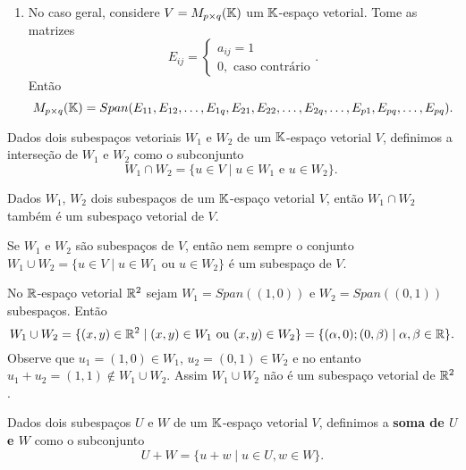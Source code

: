 \begin{exemplos}
\begin{enumerate}
        \item No caso geral, considere $V = M_{p \times q}(\mathbb{K})$ um $\mathbb{K}$-espaço vetorial. Tome as matrizes
         \[
            E_{ij} = \begin{cases}
                a_{ij} = 1\\
                0, \mbox{ caso contrário}
                \end{cases}.
         \]
         Então
         \[
            M_{p \times q}(\mathbb{K}) = Span(E_{11}, E_{12}, \dots, E_{1q}, E_{21}, E_{22}, \dots, E_{2q}, \dots, E_{p1}, E_{pq}, \dots, E_{pq}).
         \]
    \end{enumerate}
\end{exemplos}

\begin{definicao}
  Dados dois subespaços vetoriais $W_1$ e $W_2$ de um $\mathbb{K}$-espaço vetorial $V$, definimos a interseção de $W_1$ e $W_2$ como o subconjunto
  \[
    W_1 \cap W_2 = \{u \in V \mid u\in W_1 \mbox{ e } u \in W_2\}.\
  \]
\end{definicao}


\begin{teorema}
  Dados $W_1$, $W_2$ dois subespaços de um $\mathbb{K}$-espaço vetorial $V$, então $W_1 \cap W_2$ também é um subespaço vetorial de $V$.
\end{teorema}

\begin{observacao}
  Se $W_1$ e $W_2$ são subespaços de $V$, então nem sempre o conjunto $W_1 \cup W_2 = \{u \in V \mid u \in W_1 \mbox{ ou } u \in W_2\}$ é um subespaço de $V$.
\end{observacao}

\begin{exemplo}
  No $\mathbb{R}$-espaço vetorial $\mathbb{R}^2$ sejam $W_1 = Span((1,0))$ e $W_2 = Span((0, 1))$ subespaços. Então
  \[
    W_1 \cup W_2 = \{(x, y) \in \mathbb{R}^2 \mid (x, y) \in W_1 \mbox{ ou } (x, y) \in W_2\} = \{(\alpha, 0); (0, \beta) \mid \alpha, \beta \in \mathbb{R}\}.
  \]
  Observe que $u_1 = (1, 0) \in W_1$, $u_2 = (0, 1) \in W_2$ e no entanto $u_1 + u_2 = (1, 1) \notin W_1 \cup W_2$. Assim $W_1 \cup W_2$ não é um subespaço vetorial de $\mathbb{R}^2$.
\end{exemplo}

\begin{definicao}
  Dados dois subespaços $U$ e $W$ de um $\mathbb{K}$-espaço vetorial $V$, definimos a \textbf{soma de $U$ e $W$} como o subconjunto
  \[
    U + W = \{u + w \mid u \in U, w \in W\}.
  \]
\end{definicao}


